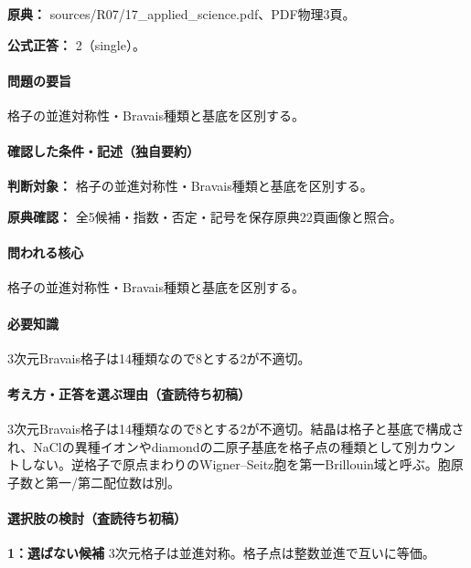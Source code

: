 \noindent\textbf{原典：} sources/R07/17\_applied\_science.pdf、PDF物理3頁。

\textbf{公式正答：} 2（single）。

\paragraph{問題の要旨} 格子の並進対称性・Bravais種類と基底を区別する。

\paragraph{確認した条件・記述（独自要約）}\mbox{}\par

\noindent\textbf{判断対象：} 格子の並進対称性・Bravais種類と基底を区別する。\par

\noindent\textbf{原典確認：} 全5候補・指数・否定・記号を保存原典22頁画像と照合。\par

\paragraph{問われる核心} 格子の並進対称性・Bravais種類と基底を区別する。

\paragraph{必要知識} 3次元Bravais格子は14種類なので8とする2が不適切。

\paragraph{考え方・正答を選ぶ理由（査読待ち初稿）} 3次元Bravais格子は14種類なので8とする2が不適切。結晶は格子と基底で構成され、NaClの異種イオンやdiamondの二原子基底を格子点の種類として別カウントしない。逆格子で原点まわりのWigner–Seitz胞を第一Brillouin域と呼ぶ。胞原子数と第一/第二配位数は別。

\paragraph{選択肢の検討（査読待ち初稿）}\mbox{}\par

\noindent\textbf{1：選ばない候補} 3次元格子は並進対称。格子点は整数並進で互いに等価。\par

